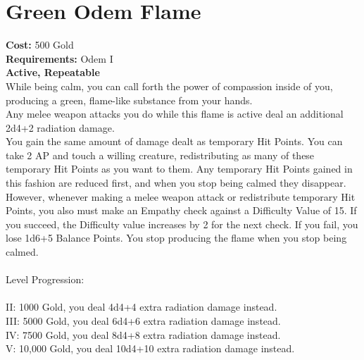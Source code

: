 \section{Green Odem Flame}
\textbf{Cost:} 500 Gold\\
\textbf{Requirements:} Odem I\\
\textbf{Active, Repeatable}\\
While being calm, you can call forth the power of compassion inside of you, producing a green, flame-like substance from your hands.\\
Any melee weapon attacks you do while this flame is active deal an additional 2d4+2 radiation damage.\\
You gain the same amount of damage dealt as temporary Hit Points. You can take 2 AP and touch a willing creature, redistributing as many of these temporary Hit Points as you want to them. Any temporary Hit Points gained in this fashion are reduced first, and when you stop being calmed they disappear.\\
However, whenever making a melee weapon attack or redistribute temporary Hit Points, you also must make an Empathy check against a Difficulty Value of 15. If you succeed, the Difficulty value increases by 2 for the next check. If you fail, you lose 1d6+5 Balance Points. You stop producing the flame when you stop being calmed.\\ 
\\
Level Progression:\\
\\
II: 1000 Gold, you deal 4d4+4 extra radiation damage instead.\\
III: 5000 Gold, you deal 6d4+6 extra radiation damage instead.\\
IV: 7500 Gold, you deal 8d4+8 extra radiation damage instead.\\
V: 10,000 Gold, you deal 10d4+10 extra radiation damage instead.\\